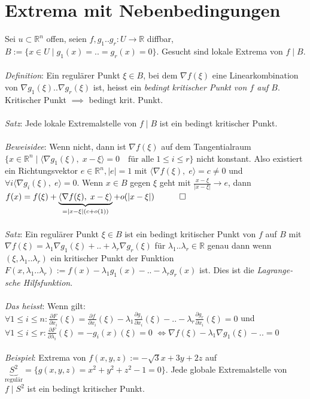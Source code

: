 \documentclass[12pt,a4paper,titlepage]{article}
\renewcommand{\d}{\partial}
\newcommand{\setR}{\mathbb{R}}
\begin{document}
\section*{Extrema mit Nebenbedingungen}
Sei $u\subset\setR^n$ offen, seien $f,g_1..g_r:U\to\setR$ diffbar, $B:=\{x\in U\mid g_1(x)=..=g_r(x)=0\}$. Gesucht sind lokale Extrema von $f\mid B$. \\
\\
\textit{Definition}: Ein regulärer Punkt $\xi\in B$, bei dem $\nabla f(\xi)$ eine Linearkombination von $\nabla g_1(\xi)..\nabla g_r(\xi)$ ist, heisst ein \emph{bedingt kritischer Punkt von $f$ auf $B$}. Kritischer Punkt $\implies$ bedingt krit. Punkt.\\
\\
\textit{Satz}: Jede lokale Extremalstelle von $f\mid B$ ist ein bedingt kritischer Punkt. \\
\\
\textit{Beweisidee}: Wenn nicht, dann ist $\nabla f(\xi)$ auf dem Tangentialraum \\
$\{x\in\setR^n\mid\langle\nabla g_1(\xi),\;x-\xi\rangle=0 \quad\text{für alle}\; 1\leq i\leq r\}$ nicht konstant. Also existiert ein Richtungsvektor $e\in\setR^n,|e|=1$ mit $\langle\nabla f(\xi),\;e\rangle = c \neq 0$ und $\forall i\langle\nabla g_i(\xi),\;e\rangle=0$. Wenn $x\in B$ gegen $\xi$ geht mit $\frac{x-\xi}{|x-\xi|}\to e$, dann $f(x)=f(\xi)+\underbrace{\langle\nabla f(\xi),\;x-\xi\rangle}_{=|x-\xi|(c+o(1))}+o(|x-\xi|) \quad \qed$ \\
\\
\textit{Satz}: Ein regulärer Punkt $\xi\in B$ ist ein bedingt kritischer Punkt von $f$ auf $B$ mit $\nabla f(\xi)=\lambda_1\nabla g_1(\xi)+..+\lambda_r\nabla g_r(\xi)$ für $\lambda_1..\lambda_r\in\setR$ genau dann wenn $(\xi,\lambda_1..\lambda_r)$ ein kritischer Punkt der Funktion $F(x,\lambda_1..\lambda_r):=f(x)-\lambda_1g_1(x)-..-\lambda_rg_r(x)$ ist. Dies ist die \emph{Lagrange-sche Hilfsfunktion}. \\
\\
\textit{Das heisst}: Wenn gilt: $\forall 1\leq i\leq n: \frac{\d F}{\d x_i}(\xi)=\frac{\d f}{\d x_i}(\xi)-\lambda_1\frac{\d g_1}{\d x_i}(\xi)-..-\lambda_r\frac{\d g_r}{\d x_i}(\xi)=0$ und \\
$\forall 1\leq i\leq r: \frac{\d F}{\d \lambda_i}(\xi)=-g_i(x)(\xi)=0$ $\iff \nabla f(\xi)-\lambda_1\nabla g_1(\xi)-..=0$ \\
\\
\textit{Beispiel}: Extrema von $f(x,y,z):=-\sqrt{3} x+3y+2z$ auf $\underbrace{S^2}_{\text{regulär}}=\{g(x,y,z)=x^2+y^2+z^2-1=0\}$. Jede globale Extremalstelle von $f\mid S^2$ ist ein bedingt kritischer Punkt. \\
\end{document}
